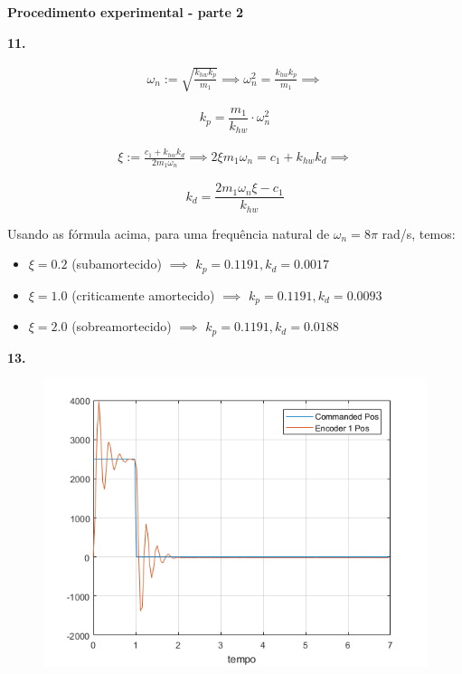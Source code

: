 \documentclass[a4paper,11pt]{article}
\begin{document}
\pagebreak

\textbf{Procedimento experimental - parte 2}

\textbf{11.}

\begin{gather*}
    \omega_n := \sqrt{\frac{k_{hw} k_p}{m_1}} \implies
        \omega_n^2 = \frac{k_{hw} k_p}{m_1} \implies
\end{gather*}

\begin{equation}
    \label{eq:kp}
    k_p = \frac{m_1}{k_{hw}} \cdot \omega_n^2
\end{equation}

\begin{gather*}
    \xi := \frac{c_1 + k_{hw} k_d}{2 m_1 \omega_n} \implies
        2 \xi m_1 \omega_n = c_1 + k_{hw} k_d \implies
\end{gather*}

\begin{equation}
    \label{eq:kd}
    k_d = \frac{2 m_1 \omega_n \xi - c_1}{k_{hw}}
\end{equation}

Usando as fórmula acima, para uma frequência natural de $\omega_n = 8 \pi$
rad/s, temos:

\begin{itemize}
\item $\xi = 0.2$ (subamortecido) $\implies$
    $k_p = 0.1191, k_d = 0.0017$
\item $\xi = 1.0$ (criticamente amortecido) $\implies$
    $k_p = 0.1191, k_d = 0.0093$
\item $\xi = 2.0$ (sobreamortecido) $\implies$
    $k_p = 0.1191, k_d = 0.0188$
\end{itemize}

\textbf{13.}

\begin{figure}[H]
\includegraphics{q13}
\centering
\end{figure}
\end{document}
